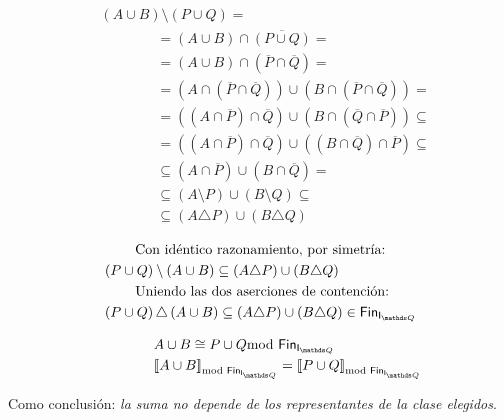 \documentclass[final,12pt,a4paper,twoside,fleqn]{extbook}
\theoremstyle{definition}
\theoremstyle{remark}
\begin{document}
\begin{align}
&\left(A \cup B\right)\setminus\left(P \cup Q\right) =  \\
&\qquad\qquad = \left(A \cup B\right)\cap\overline{\left(P \cup Q\right)} =
\\
&\qquad\qquad = \left(A \cup B\right)\cap {\left(\overline{P} \cap
\overline{Q}\right)} = \\
&\qquad\qquad = \left( A \cap { \left( \overline{P} \cap \overline{Q}
\right)} \right) \cup \left( B \cap { \left( \overline{P} \cap \overline{Q}
\right) } \right) = \\
&\qquad\qquad = \left( \left( A \cap \overline{P} \right) \cap \overline{Q}
\right) \cup \left( B \cap \left( \overline{Q} \cap \overline{P} \right)
\right) \subseteq \\
&\qquad\qquad = \left( \left( A \cap \overline{P} \right) \cap \overline{Q}
\right) \cup \left( \left( B \cap \overline{Q} \right) \cap \overline{P}
\right) \subseteq \\
&\qquad\qquad \subseteq \left( A \cap \overline{P} \right) \cup \left( B \cap
\overline{Q} \right) = \\
&\qquad\qquad \subseteq \left( A \setminus P \right) \cup \left( B \setminus
Q \right) \subseteq \\
&\qquad\qquad \subseteq \left( A \triangle P \right) \cup \left( B \triangle
Q \right)
\end{align}



\begin{align}
&\qquad \text{ Con idéntico razonamiento, por simetría:} \\
& \left(P \cup Q\right) \setminus \left(A \cup B\right) \subseteq \left( A
\triangle P \right) \cup \left( B \triangle Q \right)\\
&\qquad \text{ Uniendo las dos aserciones de contención:} \\
& \left(P \cup Q\right) \triangle \left(A \cup B\right) \subseteq \left( A
\triangle P \right) \cup \left( B \triangle Q \right) \in \FinIQ
\end{align}



\begin{align}
&\qquad\qquad A \cup B \cong P \cup Q \FinDiffRel \\
&\qquad\qquad \ClEqFinDiff{A\cup B} = \ClEqFinDiff{P\cup Q}
\end{align}


	Como conclusión: \emph{la suma no depende de los representantes de la clase elegidos}.
\end{document}
